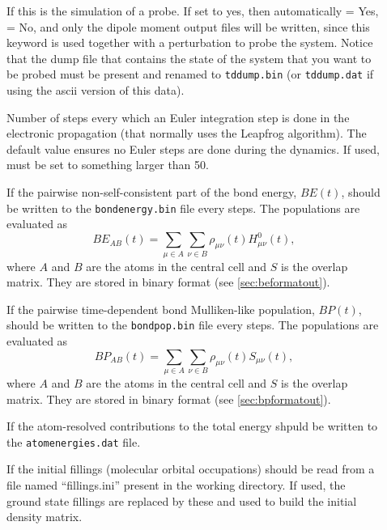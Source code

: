 \begin{description}
\item[] If this is the simulation of a probe. If set to yes,
  then automatically  = Yes,  = No, and
  only the dipole moment output files will be written, since this
  keyword is used together with a  perturbation to probe the
  system. Notice that the dump file that contains the state of the
  system that you want to be probed must be present and renamed to
  \verb|tddump.bin| (or \verb|tddump.dat| if using the ascii
  version of this data).

\item[] Number of steps every which an Euler
  integration step is done in the electronic propagation (that
  normally uses the Leapfrog algorithm). The default value ensures no
  Euler steps are done during the dynamics. If used, must be set to
  something larger than 50.

\item[] If the pairwise non-self-consistent part of the bond
  energy, $BE(t)$, should be written to the \verb|bondenergy.bin| file every
   steps. The populations are evaluated as
  \begin{equation*}
    BE_{AB}(t) = \sum_{\mu \in A} \sum_{\nu \in B} \rho_{\mu \nu}(t) H^0_{\mu
      \nu}(t),
  \end{equation*}
  where $A$ and $B$ are the atoms in the central cell and $S$ is the overlap
  matrix. They are stored in binary format (see \ref{sec:beformatout}).

\item[] If the pairwise time-dependent bond
  Mulliken-like population,  $BP(t)$, should be written
  to the \verb|bondpop.bin| file every  steps. The
  populations are evaluated as
  \begin{equation*}
    BP_{AB} (t) = \sum_{\mu \in A} \sum_{\nu \in B} \rho_{\mu \nu}(t) S_{\mu
      \nu}(t),
  \end{equation*}
  where $A$ and $B$ are the atoms in the central cell and $S$ is the overlap
  matrix. They are stored in binary format (see \ref{sec:bpformatout}).

\item[] If the atom-resolved contributions to the total energy
shpuld be written to the \verb|atomenergies.dat| file.

\item[] If the initial fillings (molecular
  orbital occupations) should be read from a file named
  ``fillings.ini'' present in the working directory. If used, the
  ground state fillings are replaced by these and used to build the
  initial density matrix.

\end{description}

